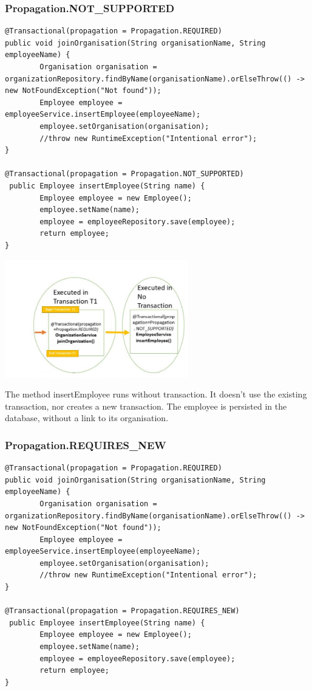 \subsubsection{Propagation.NOT\_SUPPORTED}

\begin{lstlisting}
@Transactional(propagation = Propagation.REQUIRED)
public void joinOrganisation(String organisationName, String employeeName) {
        Organisation organisation = organizationRepository.findByName(organisationName).orElseThrow(() -> new NotFoundException("Not found"));
        Employee employee = employeeService.insertEmployee(employeeName);
        employee.setOrganisation(organisation);
        //throw new RuntimeException("Intentional error");
}

@Transactional(propagation = Propagation.NOT_SUPPORTED)
 public Employee insertEmployee(String name) {
        Employee employee = new Employee();
        employee.setName(name);
        employee = employeeRepository.save(employee);
        return employee;
}
\end{lstlisting}

\includegraphics[width=8cm]{./images/jpa/transaction_propagation_3}

The method insertEmployee runs without transaction. It doesn't use the existing transaction, nor creates a new transaction. The employee is persisted in the database, without a link to its organisation.

\subsubsection{Propagation.REQUIRES\_NEW}

\begin{lstlisting}
@Transactional(propagation = Propagation.REQUIRED)
public void joinOrganisation(String organisationName, String employeeName) {
        Organisation organisation = organizationRepository.findByName(organisationName).orElseThrow(() -> new NotFoundException("Not found"));
        Employee employee = employeeService.insertEmployee(employeeName);
        employee.setOrganisation(organisation);
        //throw new RuntimeException("Intentional error");
}

@Transactional(propagation = Propagation.REQUIRES_NEW)
 public Employee insertEmployee(String name) {
        Employee employee = new Employee();
        employee.setName(name);
        employee = employeeRepository.save(employee);
        return employee;
}
\end{lstlisting}

